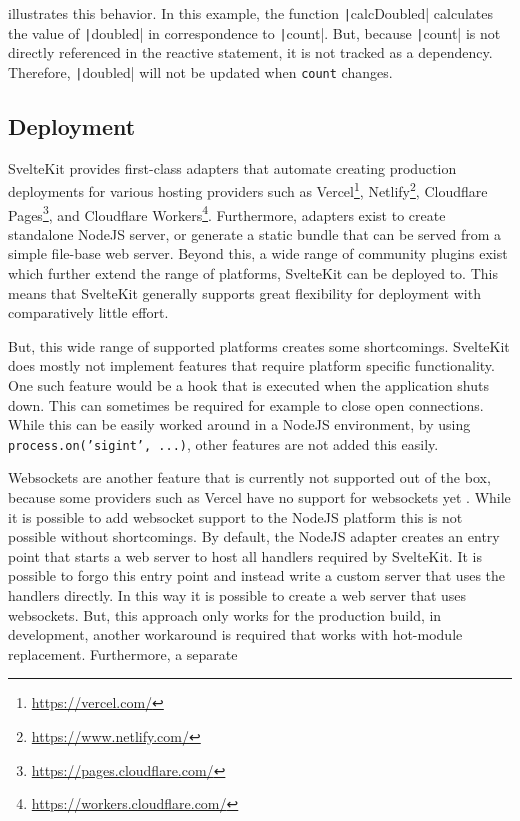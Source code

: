  illustrates this behavior. In this example, the function \texttt|calcDoubled| calculates the value of \texttt|doubled| in correspondence to \texttt|count|. But, because \texttt|count| is not directly referenced in the reactive statement, it is not tracked as a dependency. Therefore, \texttt|doubled| will not be updated when \texttt{count} changes.



\subsection{Deployment}
SvelteKit provides first-class adapters that automate creating production deployments for various hosting providers such as Vercel\footnote{\url{https://vercel.com/}}, Netlify\footnote{\url{https://www.netlify.com/}}, Cloudflare Pages\footnote{\url{https://pages.cloudflare.com/}}, and Cloudflare Workers\footnote{\url{https://workers.cloudflare.com/}}. Furthermore, adapters exist to create standalone NodeJS server, or generate a static bundle that can be served from a simple file-base web server. Beyond this, a wide range of community plugins exist which further extend the range of platforms, SvelteKit can be deployed to. This means that SvelteKit generally supports great flexibility for deployment with comparatively little effort.  

But, this wide range of supported platforms creates some shortcomings. SvelteKit does mostly not implement features that require platform specific functionality. One such feature would be a hook that is executed when the application shuts down. This can sometimes be required for example to close open connections. While this can be easily worked around in a NodeJS environment, by using \texttt{process.on('sigint', ...)}, other features are not added this easily. 

Websockets are another feature that is currently not supported out of the box, because some providers such as Vercel have no support for websockets yet \cite{noauthor_vercel_nodate}. While it is possible to add websocket support to the NodeJS platform this is not possible without shortcomings. By default, the NodeJS adapter creates an entry point that starts a web server to host all handlers required by SvelteKit. It is possible to forgo this entry point and instead write a custom server that uses the handlers directly. In this way it is possible to create a web server that uses websockets. But, this approach only works for the production build, in development, another workaround is required that works with hot-module replacement. Furthermore, a separate 

